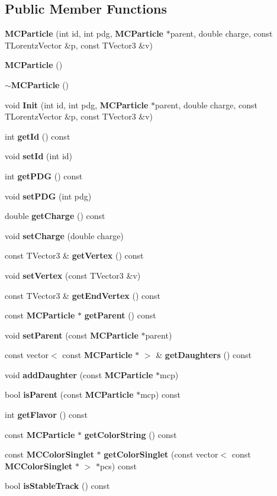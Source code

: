 \subsection*{Public Member Functions}
\begin{DoxyCompactItemize}
\item 
{\bf M\-C\-Particle} (int id, int pdg, {\bf M\-C\-Particle} $\ast$parent, double charge, const T\-Lorentz\-Vector \&p, const T\-Vector3 \&v)
\item 
{\bf M\-C\-Particle} ()
\item 
{\bf $\sim$\-M\-C\-Particle} ()
\item 
void {\bf Init} (int id, int pdg, {\bf M\-C\-Particle} $\ast$parent, double charge, const T\-Lorentz\-Vector \&p, const T\-Vector3 \&v)
\item 
int {\bf get\-Id} () const 
\item 
void {\bf set\-Id} (int id)
\item 
int {\bf get\-P\-D\-G} () const 
\item 
void {\bf set\-P\-D\-G} (int pdg)
\item 
double {\bf get\-Charge} () const 
\item 
void {\bf set\-Charge} (double charge)
\item 
const T\-Vector3 \& {\bf get\-Vertex} () const 
\item 
void {\bf set\-Vertex} (const T\-Vector3 \&v)
\item 
const T\-Vector3 \& {\bf get\-End\-Vertex} () const 
\item 
const {\bf M\-C\-Particle} $\ast$ {\bf get\-Parent} () const 
\item 
void {\bf set\-Parent} (const {\bf M\-C\-Particle} $\ast$parent)
\item 
const vector$<$ const {\bf M\-C\-Particle} $\ast$ $>$ \& {\bf get\-Daughters} () const 
\item 
void {\bf add\-Daughter} (const {\bf M\-C\-Particle} $\ast$mcp)
\item 
bool {\bf is\-Parent} (const {\bf M\-C\-Particle} $\ast$mcp) const 
\item 
int {\bf get\-Flavor} () const 
\item 
const {\bf M\-C\-Particle} $\ast$ {\bf get\-Color\-String} () const 
\item 
const {\bf M\-C\-Color\-Singlet} $\ast$ {\bf get\-Color\-Singlet} (const vector$<$ const {\bf M\-C\-Color\-Singlet} $\ast$ $>$ $\ast$pcs) const 
\item 
bool {\bf is\-Stable\-Track} () const 

\end{DoxyCompactItemize}
